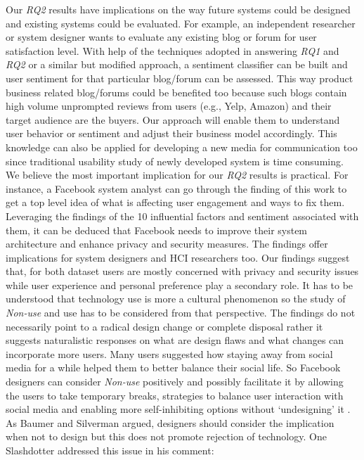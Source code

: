 Our \textit{RQ2} results have implications on the way future systems could be designed and existing systems could be evaluated. For example, an independent researcher or system designer wants to evaluate any existing blog or forum for user satisfaction level. With help of the techniques adopted in answering \textit{RQ1} and \textit{RQ2} or a similar but modified approach, a sentiment classifier can be built and user sentiment for that particular blog/forum can be assessed. This way product business related blog/forums could be benefited too because such blogs contain high volume unprompted reviews from users (e.g., Yelp, Amazon) and their target audience are the buyers. Our approach will enable them to understand user behavior or sentiment and adjust their business model accordingly. This knowledge can also be applied for developing a new media for communication too since traditional usability study of newly developed system is time consuming. We believe the most important implication for our \textit{RQ2} results is practical. For instance, a Facebook system analyst can go through the finding of this work to get a top level idea of what is affecting user engagement and ways to fix them. Leveraging the findings of the 10 influential factors and sentiment associated with them, it can be deduced that Facebook needs to improve their system architecture and enhance privacy and security measures. The findings offer implications for system designers and HCI researchers too. Our findings suggest that, for both dataset users are mostly concerned with privacy and security issues while user experience and personal preference play a secondary role. It has to be understood that technology use is more a cultural phenomenon \cite{satchell2009beyond} so the study of \emph{Non-use} and use has to be considered from that perspective. The findings do not necessarily point to a radical design change or complete disposal rather it suggests naturalistic responses on what are design flaws and what changes can incorporate more users. Many users suggested how staying away from social media for a while helped them to better balance their social life. So Facebook designers can consider \emph{Non-use} positively and possibly facilitate it by allowing the users to take temporary breaks, strategies to balance user interaction with social media \cite{schoenebeck2014giving} and enabling more self-inhibiting options without `undesigning' it \cite{pierce2012undesigning}. As Baumer and Silverman \cite{baumer2011implication} argued, designers should consider the implication when not to design \cite{dourish2006implications} but this does not promote rejection of technology. One Slashdotter addressed this issue in his comment:

